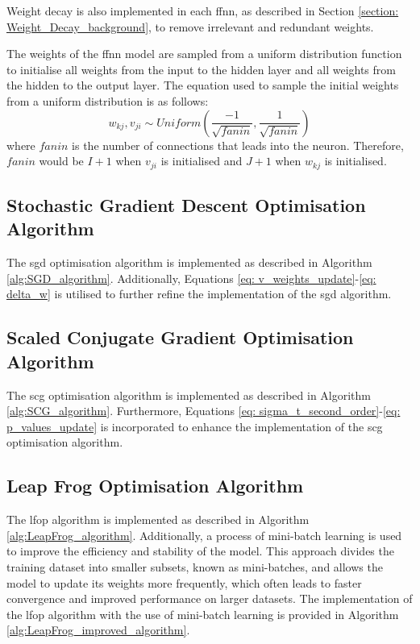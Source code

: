 \documentclass[10pt, conference]{IEEEtran}
\begin{document}
Weight decay is also implemented in each \acrshort{ffnn}, as described in Section \ref{section: Weight_Decay_background},
to remove irrelevant and redundant weights.

The weights of the \acrshort{ffnn} model are sampled from a uniform distribution function to initialise
all weights from the input to the hidden layer and all weights from the hidden to the output layer.
The equation used to sample the initial weights from a uniform distribution is as follows:
\begin{equation}
    w_{kj}, v_{ji} \sim Uniform \left( \frac{-1}{\sqrt{fanin}}, \frac{1}{\sqrt{fanin}} \right)
\end{equation}
where $fanin$ is the number of connections that leads into the neuron. Therefore, $fanin$ would be
$I+1$ when $v_{ji}$ is initialised and $J+1$ when $w_{kj}$ is initialised.

\subsection{Stochastic Gradient Descent Optimisation Algorithm}

The \acrshort{sgd} optimisation algorithm is implemented as described in Algorithm \ref{alg:SGD_algorithm}.
Additionally, Equations \ref{eq: v_weights_update}-\ref{eq: delta_w} is utilised to further refine
the implementation of the \acrshort{sgd} algorithm.

\subsection{Scaled Conjugate Gradient Optimisation Algorithm}

The \acrshort{scg} optimisation algorithm is implemented as described in Algorithm \ref{alg:SCG_algorithm}.
Furthermore, Equations \ref{eq: sigma_t_second_order}-\ref{eq: p_values_update} is incorporated
to enhance the implementation of the \acrshort{scg} optimisation algorithm.

\subsection{Leap Frog Optimisation Algorithm}

The \acrshort{lfop} algorithm is implemented as described in Algorithm \ref{alg:LeapFrog_algorithm}. Additionally,
a process of mini-batch learning is used to improve the efficiency and stability of the model. This approach
divides the training dataset into smaller subsets, known as mini-batches, and allows the model to update its
weights more frequently, which often leads to faster convergence and improved performance on larger datasets.
The implementation of the \acrshort{lfop} algorithm with the use of mini-batch learning is provided in Algorithm
\ref{alg:LeapFrog_improved_algorithm}.
\end{document}

